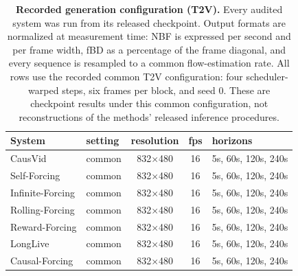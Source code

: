 \begin{table}[tb]
\centering
\small
\setlength{\tabcolsep}{5pt}
\begin{tabular}{l l c c l}
\toprule
System & setting & resolution & fps & horizons \\
\midrule
CausVid & common & 832$\times$480 & 16 & 5s, 60s, 120s, 240s \\
Self-Forcing & common & 832$\times$480 & 16 & 5s, 60s, 120s, 240s \\
Infinite-Forcing & common & 832$\times$480 & 16 & 5s, 60s, 120s, 240s \\
Rolling-Forcing & common & 832$\times$480 & 16 & 5s, 60s, 120s, 240s \\
Reward-Forcing & common & 832$\times$480 & 16 & 5s, 60s, 120s, 240s \\
LongLive & common & 832$\times$480 & 16 & 5s, 60s, 120s, 240s \\
Causal-Forcing & common & 832$\times$480 & 16 & 5s, 60s, 120s, 240s \\
\bottomrule
\end{tabular}
\caption{\textbf{Recorded generation configuration (T2V).} Every audited system was run from its released checkpoint. Output formats are normalized at measurement time: NBF is expressed per second and per frame width, fBD as a percentage of the frame diagonal, and every sequence is resampled to a common flow-estimation rate. All rows use the recorded common T2V configuration: four scheduler-warped steps, six frames per block, and seed $0$. These are checkpoint results under this common configuration, not reconstructions of the methods' released inference procedures.}
\label{tab:native_config}
\end{table}